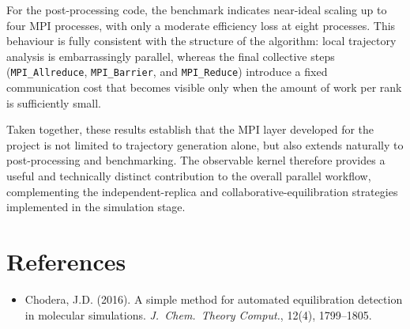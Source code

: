 \documentclass[11pt, a4paper]{article}
\begin{document}
For the post-processing code, the benchmark indicates near-ideal scaling up to
four MPI processes, with only a moderate efficiency loss at eight processes.
This behaviour is fully consistent with the structure of the algorithm: local
trajectory analysis is embarrassingly parallel, whereas the final collective
steps (\texttt{MPI\_Allreduce}, \texttt{MPI\_Barrier}, and
\texttt{MPI\_Reduce}) introduce a fixed communication cost that becomes visible
only when the amount of work per rank is sufficiently small.

Taken together, these results establish that the MPI layer developed for the
project is not limited to trajectory generation alone, but also extends
naturally to post-processing and benchmarking. The observable kernel therefore
provides a useful and technically distinct contribution to the overall parallel
workflow, complementing the independent-replica and collaborative-equilibration
strategies implemented in the simulation stage.


\section*{References}
\begin{itemize}
  \item Chodera, J.D. (2016). A simple method for automated equilibration
        detection in molecular simulations.
        \textit{J.\ Chem.\ Theory Comput.}, 12(4), 1799--1805.
\end{itemize}
\end{document}
